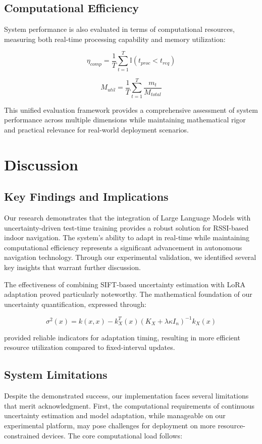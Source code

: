 \documentclass[12pt]{article}
\begin{document}
\subsection{Computational Efficiency}

System performance is also evaluated in terms of computational resources, measuring both real-time processing capability and memory utilization:

\[
    \eta_{comp} = \frac{1}{T}\sum_{t=1}^T \mathbb{I}(t_{proc} < t_{req})
\]

\[
    M_{util} = \frac{1}{T}\sum_{t=1}^T \frac{m_t}{M_{total}}
\]

This unified evaluation framework provides a comprehensive assessment of system performance across multiple dimensions while maintaining mathematical rigor and practical relevance for real-world deployment scenarios.


\section{Discussion}

\subsection{Key Findings and Implications}
Our research demonstrates that the integration of Large Language Models with uncertainty-driven test-time training provides a robust solution for RSSI-based indoor navigation. The system's ability to adapt in real-time while maintaining computational efficiency represents a significant advancement in autonomous navigation technology. Through our experimental validation, we identified several key insights that warrant further discussion.

The effectiveness of combining SIFT-based uncertainty estimation with LoRA adaptation proved particularly noteworthy. The mathematical foundation of our uncertainty quantification, expressed through:

\[
\sigma^2(x) = k(x,x) - k_X^T(x)(K_X + \lambda\kappa I_n)^{-1}k_X(x)
\]

provided reliable indicators for adaptation timing, resulting in more efficient resource utilization compared to fixed-interval updates.

\subsection{System Limitations}
Despite the demonstrated success, our implementation faces several limitations that merit acknowledgment. First, the computational requirements of continuous uncertainty estimation and model adaptation, while manageable on our experimental platform, may pose challenges for deployment on more resource-constrained devices. The core computational load follows:
\end{document}
